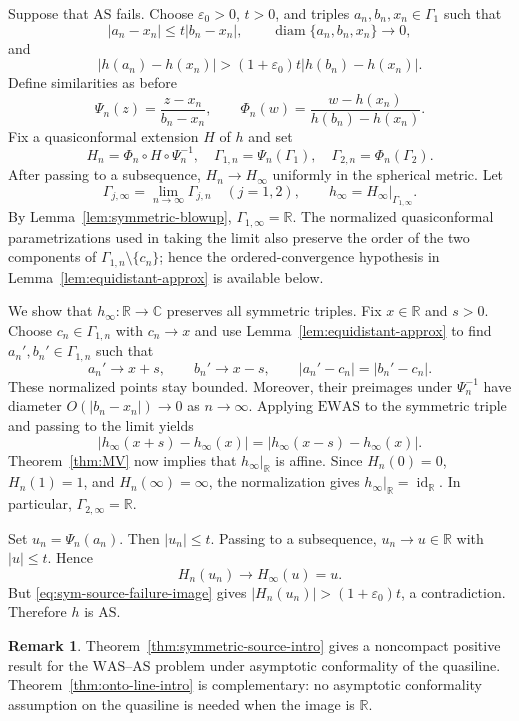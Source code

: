 \documentclass[11pt]{amsart}
\numberwithin{equation}{section}
\theoremstyle{definition} %
\theoremstyle{remarkstyle}
\newtheorem*{remark}{Remark} %
\newcommand{\R}{\mathbb{R}}
\newcommand{\C}{\mathbb{C}}
\newcommand{\diam}{\operatorname{diam}}
\newcommand{\id}{\operatorname{id}}
\begin{document}
\medskip

Suppose that $\mathrm{AS}$ fails.  
Choose $\varepsilon_0>0$, $t>0$, and triples $a_n,b_n,x_n\in\Gamma_1$ such that
\begin{equation*}
 |a_n-x_n|\leq t|b_n-x_n|,\qquad \diam\{a_n,b_n,x_n\}\to0,
\end{equation*}
and
\begin{equation}\label{eq:sym-source-failure-image}
 |h(a_n)-h(x_n)|>(1+\varepsilon_0)t|h(b_n)-h(x_n)|.
\end{equation}
Define similarities as before
\[
 \Psi_n(z)=\frac{z-x_n}{b_n-x_n},
 \qquad
 \Phi_n(w)=\frac{w-h(x_n)}{h(b_n)-h(x_n)}.
\]
Fix a quasiconformal extension $H$ of $h$ and set
\[
 H_n=\Phi_n\circ H\circ \Psi_n^{-1},
 \quad
 \Gamma_{1,n}=\Psi_n(\Gamma_1),
 \quad
 \Gamma_{2,n}=\Phi_n(\Gamma_2).
\]
After passing to a subsequence, $H_n\to H_\infty$ uniformly in the spherical metric.  
Let
\[
 \Gamma_{j,\infty}=\lim_{n \to \infty}\Gamma_{j,n} \quad (j=1,2),\qquad  h_\infty=H_\infty|_{\Gamma_{1,\infty}}.
\]
By Lemma~\ref{lem:symmetric-blowup}, $\Gamma_{1,\infty}=\R$.
The normalized quasiconformal parametrizations used in taking the limit also preserve the order of the two components of $\Gamma_{1,n}\setminus\{c_n\}$; hence the ordered-convergence hypothesis in
Lemma~\ref{lem:equidistant-approx} is available below.

We show that $h_\infty\colon\R\to\C$ preserves all symmetric  triples.  
Fix $x\in\R$ and $s>0$.  
Choose $c_n\in\Gamma_{1,n}$ with $c_n\to x$ and use Lemma~\ref{lem:equidistant-approx} to find $a_n',b_n'\in\Gamma_{1,n}$ such that
\[
 a_n'\to x+s,\qquad b_n'\to x-s,\qquad |a_n'-c_n|=|b_n'-c_n|.
\]
These normalized points stay bounded. Moreover, their preimages under $\Psi_n^{-1}$ have diameter $O(|b_n-x_n|)\to0$
as $n \to \infty$.  
Applying $\mathrm{EWAS}$ to the symmetric  triple and passing to the limit yields
\[
 |h_\infty(x+s)-h_\infty(x)|=|h_\infty(x-s)-h_\infty(x)|.
\]
Theorem~\ref{thm:MV} now implies that $h_\infty|_{\mathbb{R}}$ is affine. 
Since $H_n(0)=0$, $H_n(1)=1$, and $H_n(\infty)=\infty$, the normalization gives $h_\infty|_{\mathbb{R}}=\id_{\R}$.
In particular, $\Gamma_{2,\infty}=\R$.

Set $u_n=\Psi_n(a_n)$.
Then $|u_n|\leq t$.  
Passing to a subsequence, $u_n\to u\in\R$ with $|u|\leq t$.  
Hence
\[
 H_n(u_n)\to  H_\infty(u)=u.
\]
But \eqref{eq:sym-source-failure-image} gives $|H_n(u_n)|>(1+\varepsilon_0)t$,
a contradiction.  
Therefore $h$ is $\mathrm{AS}$.


\begin{remark}
Theorem~\ref{thm:symmetric-source-intro} gives a noncompact positive result for the $\mathrm{WAS}$--$\mathrm{AS}$ problem under asymptotic conformality of the quasiline.
Theorem~\ref{thm:onto-line-intro} is complementary: no asymptotic conformality assumption on the quasiline is needed when the image is $\mathbb{R}$.
\end{remark}
\end{document}
